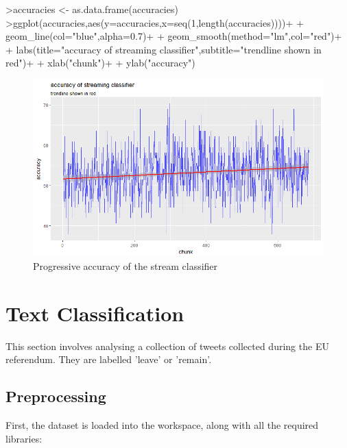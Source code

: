 \documentclass[10pt]{article}
\begin{document}
\begin{Schunk}
\begin{Sinput}
>accuracies <- as.data.frame(accuracies)
>ggplot(accuracies,aes(y=accuracies,x=seq(1,length(accuracies))))+
+  geom_line(col="blue",alpha=0.7)+
+ geom_smooth(method="lm",col="red")+
+  labs(title="accuracy of streaming classifier",subtitle="trendline shown in red")+
+  xlab("chunk")+
+  ylab("accuracy")

\end{Sinput}
\end{Schunk}


\begin{figure}[H]
\begin{center}
\includegraphics{stream_result}
\caption {Progressive accuracy of the stream classifier}
\label{fig2}
\end {center}
\end {figure}

\section {Text Classification}

This section involves analysing a collection of tweets collected during the EU referendum. They are labelled 'leave' or 'remain'.



\subsection{Preprocessing}

First, the dataset is loaded into the workspace, along with all the required libraries:
\end{document}
